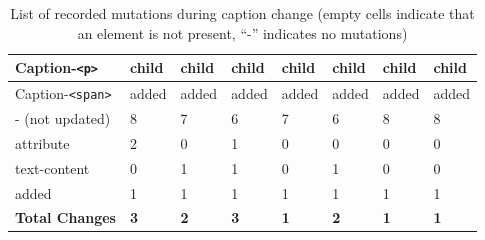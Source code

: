 \documentclass[a4paper, 10pt]{article}
\begin{document}
\begin{table}[!ht]
\begin{adjustbox}{angle=90}
\begin{tabular}{|l|l|l|l|l|l|l|l|}
      Caption-\verb|<p>|              & child             & child           & child             & child         & child           & child           & child           \\ \hline
      Caption-\verb|<span>|           & added             & added           & added             & added         & added           & added           & added           \\ \hline
      \hline
      - (not updated)                 & 8                 & 7               & 6                 & 7             & 6               & 8               & 8               \\ \hline
      \hline
      attribute                       & 2                 & 0               & 1                 & 0             & 0               & 0               & 0               \\ \hline
      text-content                    & 0                 & 1               & 1                 & 0             & 1               & 0               & 0               \\ \hline
      added                           & 1                 & 1               & 1                 & 1             & 1               & 1               & 1               \\ \hline
      \hline
      \textbf{Total Changes}          & \textbf{3}        & \textbf{2}      & \textbf{3}        & \textbf{1}    & \textbf{2}      & \textbf{1}      & \textbf{1}      \\ \hline
    \end{tabular}
  \end{adjustbox}
  \caption{List of recorded mutations during caption change (empty cells indicate that an element is not present, \enquote{-} indicates no mutations)}
  \label{tab:mutations:captionChange}
\end{table}
\end{document}
